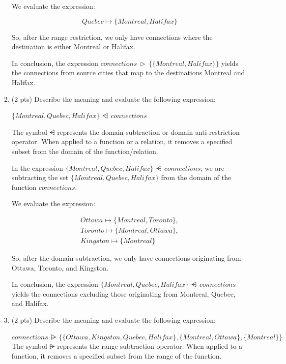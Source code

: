 \documentclass[12pt]{article}
\begin{document}
\begin{spacing}{1.5}
\begin{enumerate}
		      We evaluate the expression:
		      
		      $$Quebec \mapsto \{Montreal, Halifax\}$$
		      
		      So, after the range restriction, we only have connections where the destination is either Montreal or Halifax.
		      
		      In conclusion, the expression $connections \: \triangleright \: \{\{Montreal, Halifax\}\}$ yields the connections from source cities that map to the destinations Montreal and Halifax.
		          
		\item (2 pts) Describe the meaning and evaluate the following expression:
		      
		      $\{Montreal, Quebec, Halifax\} \: \ndres \: connections$
		      
		      The symbol $\ndres$ represents the domain subtraction or domain anti-restriction operator. When applied to a function or a relation, it removes a specified subset from the domain of the function/relation.
		      
		      In the expression $\{Montreal, Quebec, Halifax\} \: \ndres \: connections$, we are subtracting the set  $\{Montreal, Quebec, Halifax\}$ from the domain of the function $connections$.
		      
		      We evaluate the expression:
		      
		      \begin{align*}
		      	Ottawa \mapsto \{Montreal, Toronto\}, \\
		      	Toronto \mapsto \{Montreal, Ottawa\}, \\
		      	Kingston \mapsto \{Montreal\}         
		      \end{align*}
		      
		      So, after the domain subtraction, we only have connections originating from Ottawa, Toronto, and Kingston.
		      
		      In conclusion, the expression $\{Montreal, Quebec, Halifax\} \: \ndres \: connections$ yields the connections excluding those originating from Montreal, Quebec, and Halifax.
		      
		\item (2 pts) Describe the meaning and evaluate the following expression:
		      
		      $connections \: \rsub \: \{\{Ottawa, Kingston, Quebec, Halifax\},\{Montreal, Ottawa\},\{Montreal\}\}$
		      \newline
		      The symbol $\rsub$ represents the range subtraction operator. When applied to a function, it removes a specified subset from the range of the function.
		      

\end{enumerate}
\end{spacing}
\end{document}
